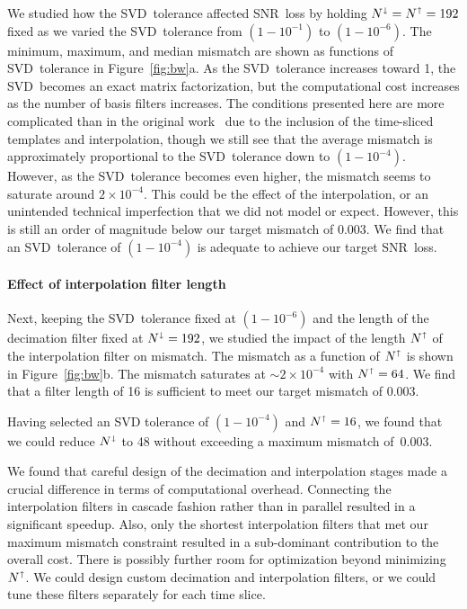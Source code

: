 \documentclass[preprint2]{aastex}
\newcommand{\SNR}{SNR}%
\newcommand{\SVD}{SVD}%
\begin{document}
We studied how the \SVD\ tolerance affected \SNR\ loss by holding
$N^\shortdownarrow = N^\shortuparrow = 192$ fixed as we varied the \SVD\
tolerance from $\left(1-10^{-1}\right)$ to $\left(1-10^{-6}\right)$.  The
minimum, maximum, and median mismatch are shown as functions of \SVD\ tolerance
in Figure~\ref{fig:bw}a.  As the \SVD\ tolerance increases toward 1, the \SVD\
becomes an exact matrix factorization, but the computational cost increases as
the number of basis filters increases.  The conditions presented here are more
complicated than in the original work~\citep{Cannon:2010p10398} due to the
inclusion of the time-sliced templates and interpolation, though we still see
that the average mismatch is approximately proportional to the \SVD\ tolerance
down to $\left(1-10^{-4}\right)$.  However, as the \SVD\ tolerance becomes even
higher, the mismatch seems to saturate around $2 \times 10^{-4}$.  This could be
the effect of the interpolation, or an unintended technical imperfection that we
did not model or expect.  However, this is still an order of magnitude below our
target mismatch of 0.003.  We find that an \SVD\ tolerance of
$\left(1-10^{-4}\right)$ is adequate to achieve our target \SNR\ loss.

\paragraph{Effect of interpolation filter length}

Next, keeping the \SVD\ tolerance fixed at $\left(1-10^{-6}\right)$ and the
length of the decimation filter fixed at $N^\shortdownarrow = 192$, we studied
the impact of the length $N^\shortuparrow$ of the interpolation filter on
mismatch.  The mismatch as a function of $N^\shortuparrow$ is shown in
Figure~\ref{fig:bw}b.  The mismatch saturates at $\sim$$2 \times 10^{-4}$ with
$N^\shortuparrow = 64$.  We find that a filter length of 16 is sufficient to
meet our target mismatch of 0.003.

Having selected an SVD tolerance of $\left(1-10^{-4}\right)$ and
$N^\shortuparrow=16$, we found that we could reduce $N^\shortdownarrow$ to 48
without exceeding a maximum mismatch of~0.003.

We found that careful design of the decimation and interpolation stages made a
crucial difference in terms of computational overhead.  Connecting the
interpolation filters in cascade fashion rather than in parallel resulted in a
significant speedup.  Also, only the shortest interpolation filters that met our
maximum mismatch constraint resulted in a sub-dominant contribution to the
overall cost.  There is possibly further room for optimization beyond minimizing
$N^\shortuparrow$.  We could design custom decimation and interpolation filters,
or we could tune these filters separately for each time slice.
\end{document}
